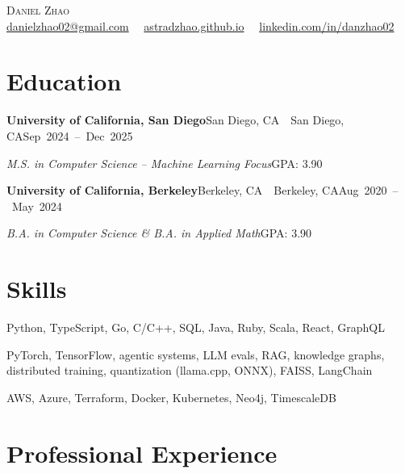 \documentclass[letterpaper,11pt]{article}
\newcommand{\entry}[3]{%
  \needspace{4\baselineskip}%
  \textbf{#1}\ifx\relax#2\relax\else\ \textbar\ #2\fi\hfill\mbox{#3}\par}
\newcommand{\detail}[2]{\textit{#1}\hfill{#2}\par}
\newenvironment{skills}
  {\begin{description}[leftmargin=0pt, labelindent=0pt, font=\normalfont\bfseries, itemsep=3pt, parsep=0pt, topsep=0pt]}
  {\end{description}}
\begin{document}
{\centering
  {\fontsize{22pt}{26pt}\selectfont\scshape Daniel Zhao}\\[6pt]
  \href{mailto:danielzhao02@gmail.com}{danielzhao02@gmail.com}\ \textbar\ %
  \href{https://astradzhao.github.io/}{astradzhao.github.io}\ \textbar\ %
  \href{https://www.linkedin.com/in/danzhao02/}{linkedin.com/in/danzhao02}
\par}
\vspace{0pt}

\section{Education}

\entry{University of California, San Diego}{San Diego, CA}{Sep 2024 -- Dec 2025}
\detail{M.S. in Computer Science -- Machine Learning Focus}{GPA: 3.90}
\vspace{8pt}

\entry{University of California, Berkeley}{Berkeley, CA}{Aug 2020 -- May 2024}
\detail{B.A. in Computer Science \& B.A. in Applied Math}{GPA: 3.90}

\section{Skills}

\begin{skills}
  \item[Languages \& Frameworks:] Python, TypeScript, Go, C/C++, SQL, Java, Ruby, Scala, React, GraphQL
  \item[ML \& LLMs:] PyTorch, TensorFlow, agentic systems, LLM evals, RAG, knowledge graphs, distributed training, quantization (llama.cpp, ONNX), FAISS, LangChain
  \item[Infrastructure:] AWS, Azure, Terraform, Docker, Kubernetes, Neo4j, TimescaleDB
\end{skills}

\section{Professional Experience}
\end{document}
